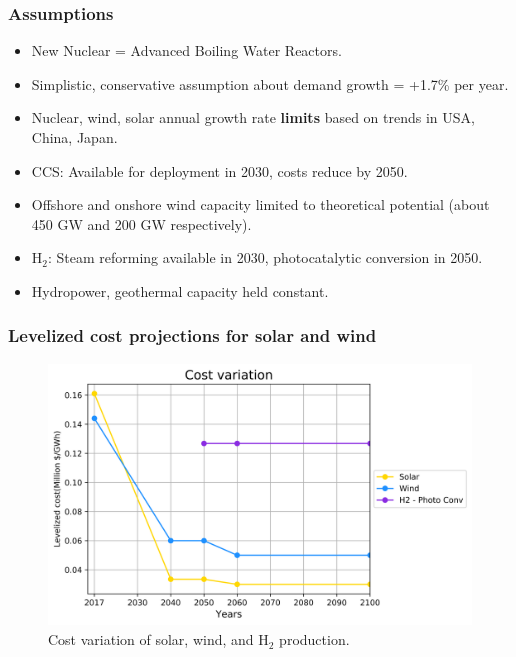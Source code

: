 \begin{frame}
  \frametitle{Assumptions}

  \begin{itemize}
  
  \item New Nuclear = Advanced Boiling Water Reactors.
  
  \item Simplistic, conservative assumption about demand growth = +1.7\% per year.
  
  \item Nuclear, wind, solar annual growth rate \textbf{limits} based on trends in USA, China, Japan.
  
  \item CCS: Available for deployment in 2030, costs reduce by 2050.
  
  \item Offshore and onshore wind capacity limited to theoretical potential (about 450 GW and 200 GW respectively).
  
  \item H$_2$: Steam reforming available in 2030, photocatalytic conversion in 2050.
  
  \item Hydropower, geothermal capacity held constant.
  
  \end{itemize}

\end{frame}


\begin{frame}
  \frametitle{Levelized cost projections for solar and wind}
  \begin{figure}[htbp!]
    \begin{center}
      \includegraphics[scale=0.6]{./images/cost}
    \end{center}
          \caption{Cost variation of solar, wind, and H$_2$ production.}
    \label{cost}
  \end{figure}
\end{frame}
